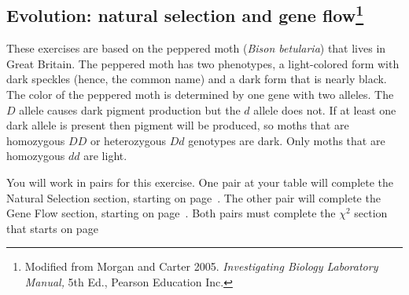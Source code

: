 \documentclass[12pt]{exam}
\newcommand{\allele}[1]{$#1$}
\begin{document}
\subsection*{Evolution: natural selection and gene flow\footnote{Modified from Morgan and Carter 2005. \emph{Investigating Biology Laboratory Manual,} 5th Ed., Pearson Education Inc.}}

These exercises are based on the peppered moth (\textit{Bison betularia}) that lives in Great Britain. The peppered moth has two phenotypes, a light-colored form with dark speckles (hence, the common name) and a dark form that is nearly black. The color of the peppered moth is determined by one gene with two alleles. The \allele{D} allele causes dark pigment production but the \allele{d} allele does not. If at least one dark allele is present then pigment will be produced, so moths that are homozygous \allele{DD} or heterozygous \allele{Dd} genotypes are dark. Only moths that are homozygous \allele{dd} are light. 

You will work in pairs for this exercise. One pair at your table will complete the Natural Selection section, starting on page~\pageref{sec:natural_selection}. The other pair will complete the Gene Flow section, starting on page~\pageref{sec:gene_flow}. Both pairs must complete the $\chi^2$ section that starts on page~\pageref{sec:chi_square}
\end{document}
